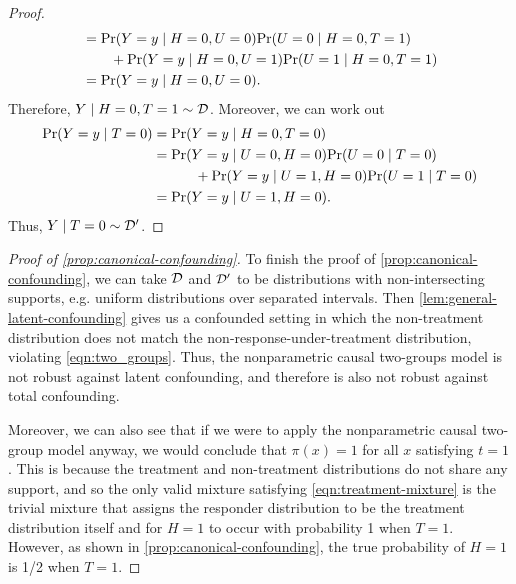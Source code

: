 \begin{proof}
\begin{align*}
&= \textnormal{Pr}(Y=y \mid H=0, U=0) \textnormal{Pr}(U=0 \mid H=0, T=1) \\
&\hspace{2em} +  \textnormal{Pr}(Y=y \mid H=0, U=1) \textnormal{Pr}(U=1 \mid H=0, T=1) \\
&= \textnormal{Pr}(Y=y \mid H=0, U=0).
\end{align*}
Therefore, $Y \mid H=0, T=1 \sim \mathcal{D}$. Moreover, we can work out
\begin{align*}
\textnormal{Pr}(Y = y \mid T=0) &= \textnormal{Pr}(Y = y \mid H=0, T=0) \\
&= \textnormal{Pr}(Y = y \mid U=0, H=0) \textnormal{Pr}(U=0 \mid T=0) \\
&\hspace{3em}+ \textnormal{Pr}(Y = y \mid U=1, H=0) \textnormal{Pr}(U=1 \mid T=0)\\
&= \textnormal{Pr}(Y = y \mid U=1, H=0).
\end{align*}
Thus, $Y \mid T=0 \sim \mathcal{D}'$.
\end{proof}

\begin{proof}[Proof of \cref{prop:canonical-confounding}]
To finish the proof of \cref{prop:canonical-confounding}, we can take $\mathcal{D}$ and $\mathcal{D}'$ to be distributions with non-intersecting supports, e.g. uniform distributions over separated intervals. Then \cref{lem:general-latent-confounding} gives us a confounded setting in which the non-treatment distribution does not match the non-response-under-treatment distribution, violating \cref{eqn:two_groups}. Thus, the nonparametric causal two-groups model is not robust against latent confounding, and therefore is also not robust against total confounding.


Moreover, we can also see that
if we were to apply the nonparametric causal two-group model anyway, we would conclude that $\pi(x) = 1$ for all $x$ satisfying $t=1$. This is because the treatment and non-treatment distributions do not share any support, and so the only valid mixture satisfying \cref{eqn:treatment-mixture} is the trivial mixture that assigns the responder distribution to be the treatment distribution itself and for $H=1$ to occur with probability 1 when $T=1$. However, as shown in \cref{prop:canonical-confounding}, the true probability of $H=1$ is 1/2 when $T=1$. 
\end{proof}


